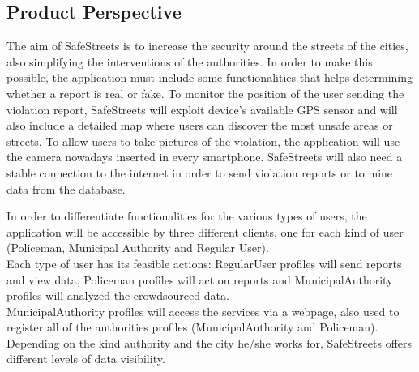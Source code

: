 \subsection{Product Perspective}
The aim of SafeStreets is to increase the security around the streets of the cities, also simplifying the interventions of the authorities. \newline
In order to make this possible, the application must include some functionalities that helps determining whether a report is real or fake. \newline
To monitor the position of the user sending the violation report, SafeStreets will exploit device’s available GPS sensor and will also include a detailed map where users can discover the most unsafe areas or streets. \newline
To allow users to take pictures of the violation, the application will use the camera nowadays inserted in every smartphone. \newline
SafeStreets will also need a stable connection to the internet in order to send violation reports or to mine data from the database. \newline\par
In order to differentiate functionalities for the various types of users, the application will be accessible by three different clients, one for each kind of user (Policeman, Municipal Authority and Regular User). \\
Each type of user has its feasible actions: RegularUser profiles will send reports and view data, Policeman profiles will act on reports and MunicipalAuthority profiles will analyzed the crowdsourced data.\\
MunicipalAuthority profiles will access the services via a webpage, also used to register all of the authorities profiles (MunicipalAuthority and Policeman).\\
Depending on the kind authority and the city he/she works for, SafeStreets offers different levels of data visibility.

\newpage


